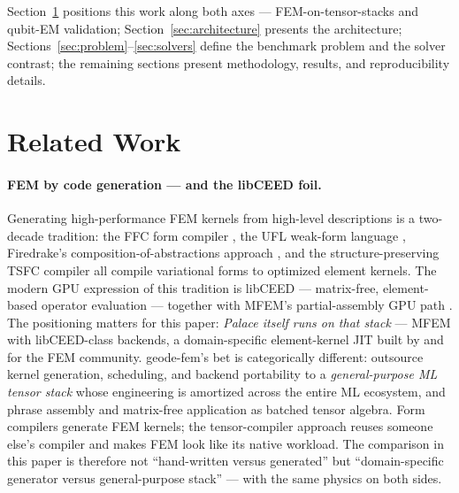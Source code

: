 \documentclass{anvil-paper}
\begin{document}
Section~\ref{sec:related} positions this work along both axes ---
FEM-on-tensor-stacks and qubit-EM validation; Section~\ref{sec:architecture}
presents the architecture; Sections~\ref{sec:problem}--\ref{sec:solvers}
define the benchmark problem and the solver contrast; the remaining
sections present methodology, results, and reproducibility details.

\section{Related Work}
\label{sec:related}

\paragraph{FEM by code generation --- and the libCEED foil.}
Generating high-performance FEM kernels from high-level descriptions is a
two-decade tradition: the FFC form compiler \citep{kirby2006compiler}, the
UFL weak-form language \citep{alnaes2014unified}, Firedrake's
composition-of-abstractions approach \citep{rathgeber2017firedrake}, and
the structure-preserving TSFC compiler \citep{homolya2018tsfc} all compile
variational forms to optimized element kernels. The modern GPU expression
of this tradition is libCEED \citep{brown2021libceed} --- matrix-free,
element-based operator evaluation --- together with MFEM's partial-assembly
GPU path \citep{andrej2024high}. The positioning matters for this paper:
\emph{Palace itself runs on that stack} --- MFEM with libCEED-class
backends, a domain-specific element-kernel JIT built by and for the FEM
community. geode-fem's bet is categorically different: outsource kernel
generation, scheduling, and backend portability to a \emph{general-purpose
ML tensor stack} whose engineering is amortized across the entire ML
ecosystem, and phrase assembly and matrix-free application as batched
tensor algebra. Form compilers generate FEM kernels; the tensor-compiler
approach reuses someone else's compiler and makes FEM look like its native
workload. The comparison in this paper is therefore not
``hand-written versus generated'' but ``domain-specific generator versus
general-purpose stack'' --- with the same physics on both sides.
\end{document}
